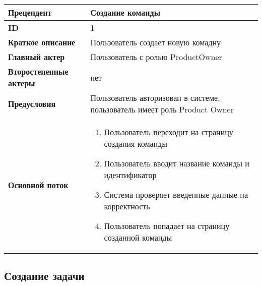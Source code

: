 \documentclass{article}
\begin{document}
\begin{tabular}{|l|p{9cm}|}
	\hline
	\textbf{Прецендент}            & Создание команды                                                          \\
	\hline
	\textbf{ID}                    & 1                                                                         \\
	\hline
	\textbf{Краткое описание}      & Пользователь создает новую комадну                                        \\
	\hline
	\textbf{Главный актер}         & Пользователь с ролью ProductOwner                                         \\
	\hline
	\textbf{Второстепенные актеры} & нет                                                                       \\
	\hline
	\textbf{Предусловия}           & Пользователь авторизован в системе, пользователь имеет роль Product Owner \\
	\hline
	\textbf{Основной поток}        & \begin{enumerate}
		                                 \item Пользователь переходит на страницу создания команды
		                                 \item Пользователь вводит название команды и идентификатор
		                                 \item Система проверяет введенные данные на корректность
		                                 \item Пользователь попадает на страницу созданной команды
	                                 \end{enumerate}                 \\
	\hline
\end{tabular}

\subsection{Создание задачи}
\end{document}
